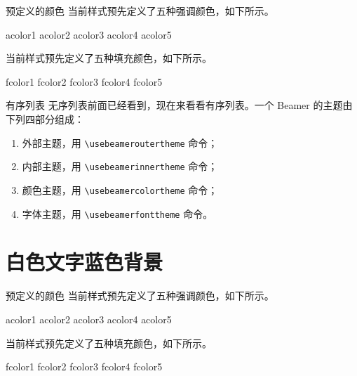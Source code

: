 \documentclass[14pt,notheorems]{beamer}
\begin{document}
\begin{frame}{预定义的颜色}
当前样式预先定义了五种强调颜色，如下所示。
\begin{flushleft}
\textcolor{acolor1}{acolor1}
\textcolor{acolor2}{acolor2}
\textcolor{acolor3}{acolor3}
\textcolor{acolor4}{acolor4}
\textcolor{acolor5}{acolor5}
\end{flushleft}
当前样式预先定义了五种填充颜色，如下所示。
\begin{flushleft}
\colorbox{fcolor1}{fcolor1}
\colorbox{fcolor2}{fcolor2}
\colorbox{fcolor3}{fcolor3}
\colorbox{fcolor4}{fcolor4}
\colorbox{fcolor5}{fcolor5}
\end{flushleft}
\end{frame}

\begin{frame}[fragile]{有序列表}
无序列表前面已经看到，现在来看看有序列表。一个 Beamer 的主题由下列四部分组成：\pause
\begin{enumerate}[<+->]
\item 外部主题，用 \verb!\usebeameroutertheme! 命令；
\item 内部主题，用 \verb!\usebeamerinnertheme! 命令；
\item 颜色主题，用 \verb!\usebeamercolortheme! 命令；
\item 字体主题，用 \verb!\usebeamerfonttheme! 命令。
\end{enumerate}
\end{frame}


\begin{frame}[plain]\transboxout
\titlepage
\end{frame}

\section{白色文字蓝色背景}

\begin{frame}{预定义的颜色}
当前样式预先定义了五种强调颜色，如下所示。
\begin{flushleft}
\textcolor{acolor1}{acolor1}
\textcolor{acolor2}{acolor2}
\textcolor{acolor3}{acolor3}
\textcolor{acolor4}{acolor4}
\textcolor{acolor5}{acolor5}
\end{flushleft}
当前样式预先定义了五种填充颜色，如下所示。
\begin{flushleft}
\colorbox{fcolor1}{fcolor1}
\colorbox{fcolor2}{fcolor2}
\colorbox{fcolor3}{fcolor3}
\colorbox{fcolor4}{fcolor4}
\colorbox{fcolor5}{fcolor5}
\end{flushleft}
\end{frame}
\end{document}
